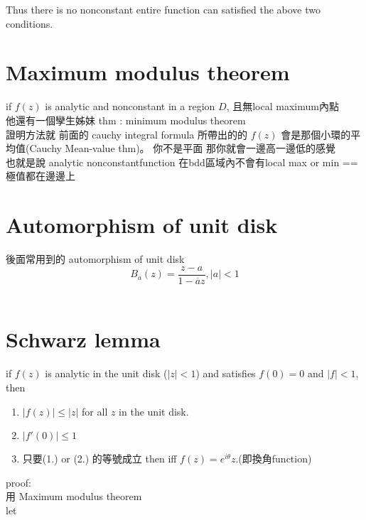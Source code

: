 \documentclass{article}
\begin{document}
Thus there is no nonconstant entire function can satisfied the above two conditions.\\

\section{Maximum modulus theorem}
if $f(z)$ is analytic and nonconstant in a region $D$, 且無local maximum內點\\

他還有一個孿生姊妹 thm : minimum modulus theorem\\
證明方法就 前面的 cauchy integral formula 所帶出的的 $f(z)$ 會是那個小環的平均值(Cauchy Mean-value thm)。
你不是平面 那你就會一邊高一邊低的感覺\\
也就是說 analytic nonconstantfunction 在bdd區域內不會有local max or min == 極值都在邊邊上\\

\section{Automorphism of unit disk}
    後面常用到的 automorphism of unit disk\\
    $$B_a(z) = \frac{z-a}{1-\overline{a}z}, |a|<1$$\\

\section{Schwarz lemma}
if $f(z)$ is analytic in the unit disk ($|z|<1$) and satisfies $f(0)=0$ and $|f|<1$, then\\
\begin{enumerate}
    \item $|f(z)| \leq |z|$ for all $z$ in the unit disk.
    \item $|f'(0)| \leq 1$
    \item 只要(1.) or (2.) 的等號成立 then iff $f(z) = e^{i\theta} z$.(即換角function)\\
\end{enumerate}

proof:\\
用 Maximum modulus theorem\\
let 
\end{document}
